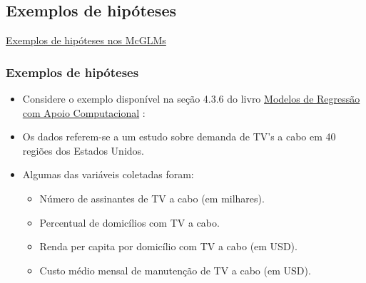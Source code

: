 \documentclass[10pt,
  aspectratio=169,
  serif,
  mathserif,
  professionalfont,
  compress,
  handout,
  ]{beamer}\usepackage[]{graphicx}\usepackage[]{color}
\begin{document}

\subsection{Exemplos de hipóteses}


\begin{frame}[c, allowframebreaks]

\begin{center}

  {\normalsize \href{https://lineu96.github.io/st/}{Exemplos de hipóteses nos McGLMs}}
  
\end{center}

\end{frame}


\begin{frame}

\frametitle{Exemplos de hipóteses}

\begin{itemize}
  
  \itemsep 2ex
  
  \item Considere o exemplo disponível na seção 4.3.6 do livro \href{https://www.ime.usp.br/~giapaula/texto_2013.pdf}{Modelos de Regressão com Apoio Computacional} \cite{paula}:
  
  \item Os dados referem-se a um estudo sobre demanda de TV's a cabo em 40 regiões dos Estados Unidos. 
  
  \item Algumas das variáveis coletadas foram:
    
    \begin{itemize}

        \item Número de assinantes de TV a cabo (em milhares).

        \item Percentual de domicílios com TV a cabo.

        \item Renda per capita por domicílio com TV a cabo (em USD).

        \item Custo médio mensal de manutenção de TV a cabo (em USD).

\end{itemize}
  
\end{itemize}

\end{frame}
\end{document}
